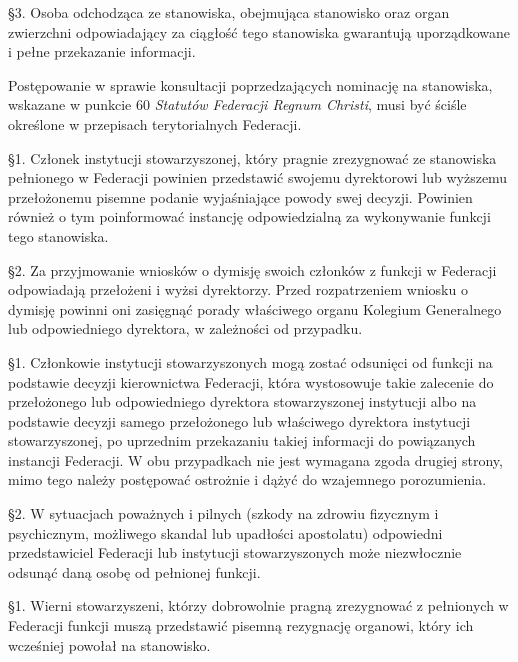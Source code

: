 \S{}3. Osoba odchodząca ze stanowiska, obejmująca stanowisko oraz organ zwierzchni odpowiadający za ciągłość tego stanowiska gwarantują uporządkowane i pełne przekazanie informacji.


 Postępowanie w sprawie konsultacji poprzedzających nominację na stanowiska, wskazane w punkcie 60 {\em Statutów Federacji Regnum Christi}, musi być ściśle określone w przepisach terytorialnych Federacji.

\filbreak{}

 \S{}1. Członek instytucji stowarzyszonej, który pragnie zrezygnować ze stanowiska pełnionego w Federacji powinien przedstawić swojemu dyrektorowi lub wyższemu przełożonemu pisemne podanie wyjaśniające powody swej decyzji. Powinien również o tym poinformować instancję odpowiedzialną za wykonywanie funkcji tego stanowiska.

\S{}2. Za przyjmowanie wniosków o dymisję swoich członków z funkcji w Federacji odpowiadają przełożeni i wyżsi dyrektorzy. Przed rozpatrzeniem wniosku o dymisję powinni oni zasięgnąć porady właściwego organu Kolegium Generalnego lub odpowiedniego dyrektora, w zależności od przypadku.


 \S{}1. Członkowie instytucji stowarzyszonych mogą zostać odsunięci od funkcji na podstawie decyzji kierownictwa Federacji, która wystosowuje takie zalecenie do przełożonego lub odpowiedniego dyrektora stowarzyszonej instytucji albo na podstawie decyzji samego przełożonego lub właściwego dyrektora instytucji stowarzyszonej, po uprzednim przekazaniu takiej informacji do powiązanych instancji Federacji. W obu przypadkach nie jest wymagana zgoda drugiej strony, mimo tego należy postępować ostrożnie i dążyć do wzajemnego porozumienia.

\S{}2. W sytuacjach poważnych i pilnych (szkody na zdrowiu fizycznym i psychicznym, możliwego skandal lub upadłości apostolatu) odpowiedni przedstawiciel Federacji lub instytucji stowarzyszonych może niezwłocznie odsunąć daną osobę od pełnionej funkcji.

\filbreak{}

 \S{}1. Wierni stowarzyszeni, którzy dobrowolnie pragną zrezygnować z pełnionych w Federacji funkcji muszą przedstawić pisemną rezygnację organowi, który ich wcześniej powołał na stanowisko. 

